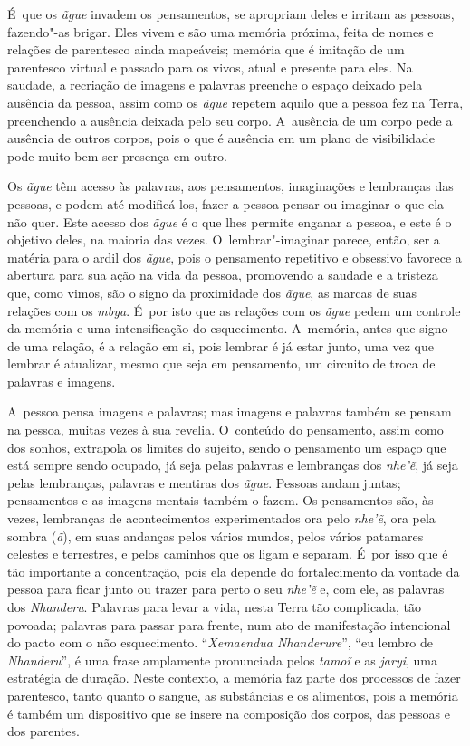 É~que os \emph{ãgue} invadem os pensamentos, se apropriam deles e irritam as
pessoas, fazendo"-as brigar. Eles vivem e são uma memória próxima, feita
de nomes e relações de parentesco ainda mapeáveis; memória que é
imitação de um parentesco virtual e passado para os vivos, atual e
presente para eles. Na saudade, a recriação de imagens e palavras
preenche o espaço deixado pela ausência da pessoa, assim como os \emph{ãgue}
repetem aquilo que a pessoa fez na Terra, preenchendo a ausência
deixada pelo seu corpo. A~ausência de um corpo pede a ausência de
outros corpos, pois o que é ausência em um plano de visibilidade pode
muito bem ser presença em outro. 

Os \emph{ãgue} têm acesso às palavras, aos pensamentos, imaginações e
lembranças das pessoas, e podem até modificá-los, fazer a pessoa pensar
ou imaginar o que ela não quer. Este acesso dos \emph{ãgue} é o que lhes
permite enganar a pessoa, e este é o objetivo deles, na maioria das
vezes. O~lembrar"-imaginar parece, então, ser a matéria para o ardil dos
\emph{ãgue}, pois o pensamento repetitivo e obsessivo favorece a abertura para
sua ação na vida da pessoa, promovendo a saudade e a tristeza que, como
vimos, são o signo da proximidade dos \emph{ãgue}, as marcas de suas relações
com os \emph{mbya}. É~por isto que as relações com os \emph{ãgue} pedem um controle
da memória e uma intensificação do esquecimento. A~memória, antes que
signo de uma relação, é a relação em si, pois lembrar é já estar junto,
uma vez que lembrar é atualizar, mesmo que seja em pensamento, um
circuito de troca de palavras e imagens.

A~pessoa pensa imagens e palavras; mas imagens e palavras também se
pensam na pessoa, muitas vezes à sua revelia. O~conteúdo do pensamento,
assim como dos sonhos, extrapola os limites do sujeito, sendo o
pensamento um espaço que está sempre sendo ocupado, já seja pelas
palavras e lembranças dos \emph{nhe’ẽ}, já seja pelas lembranças,
palavras e mentiras dos \emph{ãgue}. Pessoas andam juntas; pensamentos e as
imagens mentais também o fazem. Os pensamentos são, às vezes, lembranças
de acontecimentos experimentados ora pelo \emph{nhe’ẽ}, ora pela sombra
(\emph{ã}), em suas andanças pelos vários mundos, pelos vários patamares
celestes e terrestres, e pelos caminhos que os ligam e separam. É~por
isso que é tão importante a concentração, pois ela depende do
fortalecimento da vontade da pessoa para ficar junto ou trazer para
perto o seu \emph{nhe’ẽ} e, com ele, as palavras dos \emph{Nhanderu}. Palavras
para levar a vida, nesta Terra tão complicada, tão povoada; palavras
para passar para frente, num ato de manifestação intencional do pacto
com o não esquecimento. ``\emph{Xemaendua Nhanderure}'', ``eu lembro de
\emph{Nhanderu}'', é uma frase amplamente pronunciada pelos \emph{tamoĩ} e as
\emph{jaryi}, uma estratégia de duração. Neste contexto, a memória faz parte
dos processos de fazer parentesco, tanto quanto o sangue, as
substâncias e os alimentos, pois a memória é também um dispositivo que
se insere na composição dos corpos, das pessoas e dos parentes.

